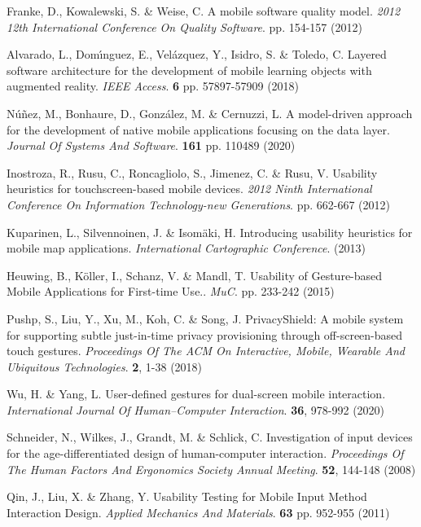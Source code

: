 \documentclass[preprint,12pt]{elsarticle}
\begin{document}
\begin{thebibliography}{99}
Franke, D., Kowalewski, S. \& Weise, C. A mobile software quality model. {\em 2012 12th International Conference On Quality Software}. pp. 154-157 (2012)

Alvarado, L., Dom\'{\i}nguez, E., Velázquez, Y., Isidro, S. \& Toledo, C. Layered software architecture for the development of mobile learning objects with augmented reality. {\em IEEE Access}. \textbf{6} pp. 57897-57909 (2018)

Núñez, M., Bonhaure, D., González, M. \& Cernuzzi, L. A model-driven approach for the development of native mobile applications focusing on the data layer. {\em Journal Of Systems And Software}. \textbf{161} pp. 110489 (2020)

Inostroza, R., Rusu, C., Roncagliolo, S., Jimenez, C. \& Rusu, V. Usability heuristics for touchscreen-based mobile devices. {\em 2012 Ninth International Conference On Information Technology-new Generations}. pp. 662-667 (2012)

Kuparinen, L., Silvennoinen, J. \& Isomäki, H. Introducing usability heuristics for mobile map applications. {\em International Cartographic Conference}. (2013)

Heuwing, B., Köller, I., Schanz, V. \& Mandl, T. Usability of Gesture-based Mobile Applications for First-time Use.. {\em MuC}. pp. 233-242 (2015)

Pushp, S., Liu, Y., Xu, M., Koh, C. \& Song, J. PrivacyShield: A mobile system for supporting subtle just-in-time privacy provisioning through off-screen-based touch gestures. {\em Proceedings Of The ACM On Interactive, Mobile, Wearable And Ubiquitous Technologies}. \textbf{2}, 1-38 (2018)

Wu, H. \& Yang, L. User-defined gestures for dual-screen mobile interaction. {\em International Journal Of Human–Computer Interaction}. \textbf{36}, 978-992 (2020)

Schneider, N., Wilkes, J., Grandt, M. \& Schlick, C. Investigation of input devices for the age-differentiated design of human-computer interaction. {\em Proceedings Of The Human Factors And Ergonomics Society Annual Meeting}. \textbf{52}, 144-148 (2008)

Qin, J., Liu, X. \& Zhang, Y. Usability Testing for Mobile Input Method Interaction Design. {\em Applied Mechanics And Materials}. \textbf{63} pp. 952-955 (2011)


\end{thebibliography}
\end{document}
